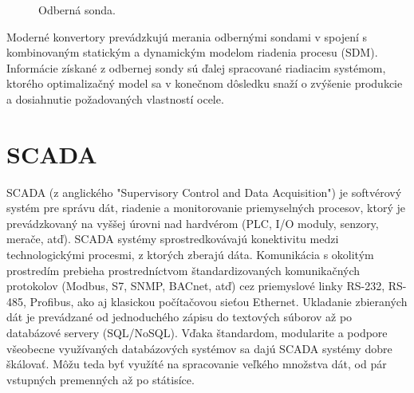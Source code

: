 \documentclass[]{tukediphc}
\begin{document}
\begin{figure}[!ht]
	\centering
	\qquad
	\caption{Odberná sonda.}
\end{figure}

Moderné konvertory prevádzkujú merania odbernými sondami v spojení s kombinovaným statickým a dynamickým modelom riadenia procesu (SDM). Informácie získané z odbernej sondy sú ďalej spracované riadiacim systémom, ktorého optimalizačný model sa v konečnom dôsledku snaží o zvýšenie produkcie a dosiahnutie požadovaných vlastností ocele.

\section{SCADA}

SCADA (z anglického "Supervisory Control and Data Acquisition") je softvérový systém pre správu dát, riadenie a monitorovanie priemyselných procesov, ktorý je prevádzkovaný na vyššej úrovni nad hardvérom (PLC, I/O moduly, senzory, merače, atď). SCADA systémy sprostredkovávajú konektivitu medzi technologickými procesmi, z ktorých zberajú dáta. Komunikácia s okolitým prostredím prebieha prostredníctvom štandardizovaných komunikačných protokolov (Modbus, S7, SNMP, BACnet, atď) cez priemyslové linky RS-232, RS-485, Profibus, ako aj klasickou počítačovou sieťou Ethernet. Ukladanie zbieraných dát je prevádzané od jednoduchého zápisu do textových súborov až po databázové servery (SQL/NoSQL). Vďaka štandardom, modularite a podpore všeobecne využívaných databázových systémov sa dajú SCADA systémy dobre škálovať. Môžu teda byť využíté na spracovanie veľkého množstva dát, od pár vstupných premenných až po státisíce.
\end{document}
